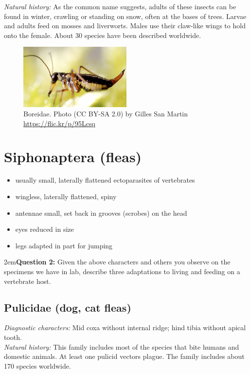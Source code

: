 \documentclass[letterpaper, 11pt]{article}
\begin{document}
\noindent{}\textit{Natural history:} As the common name suggests, adults of these insects can be found in winter, crawling or standing on snow, often at the bases of trees. Larvae and adults feed on mosses and liverworts. Males use their claw-like wings to hold onto the female. About 30 species have been described worldwide.

\begin{figure}[ht!]
  \centering
    \includegraphics[width=0.5\textwidth]{BoreidHabitus}
  \caption{Boreidae. Photo (CC BY-SA 2.0) by Gilles San Martin \url{https://flic.kr/p/95Lcsq}}
  \label{fig:boreid}
\end{figure}

\section{Siphonaptera (fleas)}
\begin{itemize}
\item usually small, laterally flattened ectoparasites of vertebrates
\item wingless, laterally flattened, spiny
\item antennae small, set back in grooves (scrobes) on the head
\item eyes reduced in size
\item legs adapted in part for jumping
\end{itemize}

\hangindent2em\textbf{Question 2:} Given the above characters and others you observe on the specimens we have in lab, describe three adaptations to living and feeding on a vertebrate host.\\

\subsection{Pulicidae (dog, cat fleas)}
\noindent{}\textit{Diagnostic characters:} Mid coxa without internal ridge; hind tibia without apical tooth.\\

\noindent{}\textit{Natural history:} This family includes most of the species that bite humans and domestic animals. At least one pulicid vectors plague. The family includes about 170 species worldwide.
\end{document}
